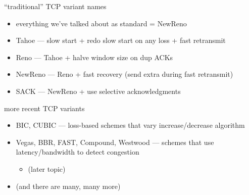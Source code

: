\begin{frame}{``traditional'' TCP variant names}
\begin{itemize}
\item everything we've talked about as standard = NewReno
\vspace{.5cm}
\item Tahoe --- slow start + redo slow start on any loss + fast retransmit
\item Reno --- Tahoe + halve window size on dup ACKs
\item NewReno --- Reno + fast recovery (send extra during fast retransmit)
\item SACK --- NewReno + use selective acknowledgments
\end{itemize}
\end{frame}

\begin{frame}{more recent TCP variants}
\begin{itemize}
\item BIC, CUBIC --- loss-based schemes that vary increase/decrease algorithm
\item Vegas, BBR, FAST, Compound, Westwood --- schemes that use latency/bandwidth to detect congestion
    \begin{itemize}
    \item (later topic)
    \end{itemize}
\item (and there are many, many more)
\end{itemize}
\end{frame}


